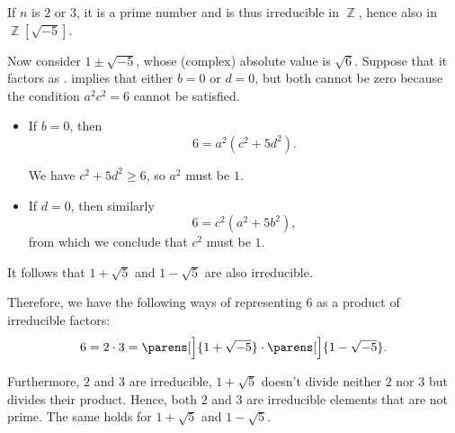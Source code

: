 \begin{example}
\begin{thmenum}
    If \( n \) is \( 2 \) or \( 3 \), it is a prime number and is thus irreducible in \( \BbbZ \), hence also in \( \BbbZ[\sqrt{-5}] \).

    Now consider \( 1 \pm \sqrt{-5} \), whose (complex) absolute value is \( \sqrt 6 \). Suppose that it factors as .  implies that either \( b = 0 \) or \( d = 0 \), but both cannot be zero because the condition \( a^2 c^2 = 6 \) cannot be satisfied.
    \begin{itemize}
      \item If \( b = 0 \), then
      \begin{equation*}
        6 = a^2 (c^2 + 5 d^2).
      \end{equation*}

      We have \( c^2 + 5 d^2 \geq 6 \), so \( a^2 \) must be \( 1 \).

      \item If \( d = 0 \), then similarly
      \begin{equation*}
        6 = c^2 (a^2 + 5b^2),
      \end{equation*}
      from which we conclude that \( c^2 \) must be \( 1 \).
    \end{itemize}

    It follows that \( 1 + \sqrt{5} \) and \( 1 - \sqrt{5} \) are also irreducible.

    Therefore, we have the following ways of representing \( 6 \) as a product of irreducible factors:
    \begin{equation*}
      6 = 2 \cdot 3 = \parens[\Big]{ 1 + \sqrt{-5} } \cdot \parens[\Big]{ 1 - \sqrt{-5}}.
    \end{equation*}

    Furthermore, \( 2 \) and \( 3 \) are irreducible, \( 1 + \sqrt{5} \) doesn't divide neither \( 2 \) nor \( 3 \) but divides their product. Hence, both \( 2 \) and \( 3 \) are irreducible elements that are not prime. The same holds for \( 1 + \sqrt{5} \) and \( 1 - \sqrt{5} \).
  \end{thmenum}
\end{example}

